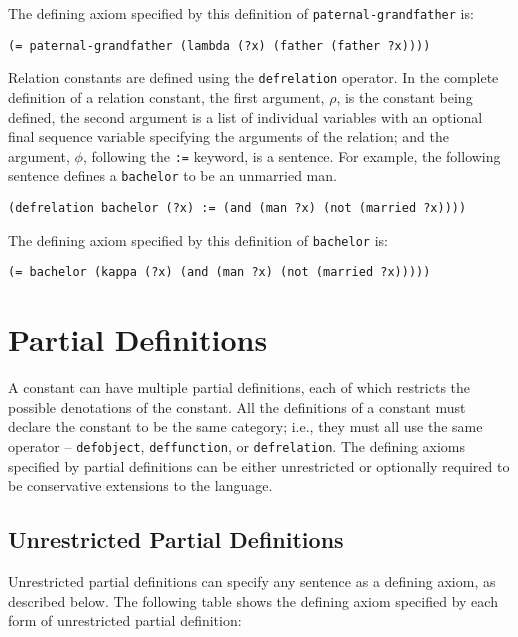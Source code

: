 The defining axiom specified by this definition of {\tt paternal-grandfather} 
is:

\medskip
{\tt (= paternal-grandfather (lambda (?x) (father (father ?x))))}
\medskip

Relation constants are defined using the {\tt defrelation} operator.  In the
complete definition of a relation constant, the first argument, $\rho$, is the
constant being defined, the second argument is a list of individual variables
with an optional final sequence variable specifying the arguments of the
relation; and the argument, $\phi$, following the {\tt :=} keyword, is a
sentence.  For example, the following sentence defines a {\tt bachelor} to be
an unmarried man.

\medskip 
{\tt (defrelation bachelor (?x) := (and (man ?x) (not (married ?x))))}
\medskip

The defining axiom specified by this definition of {\tt bachelor} is:

\medskip
{\tt (= bachelor (kappa (?x) (and (man ?x) (not (married ?x)))))}
\medskip

\section{Partial Definitions}

A constant can have multiple partial definitions, each of which restricts the 
possible denotations of the constant.  All the definitions of a constant must 
declare the constant to be the same category; i.e., they must all use the same
operator -- {\tt defobject}, {\tt deffunction}, or {\tt defrelation}.  The defining 
axioms specified by partial definitions can be either unrestricted or optionally 
required to be conservative extensions to the language.  

\subsection{Unrestricted Partial Definitions}

Unrestricted partial definitions can specify any sentence as a defining axiom,
as described below.  The following table shows the defining axiom specified by
each form of unrestricted partial definition:

\medskip
\centerline{\vbox{}}\medskip

